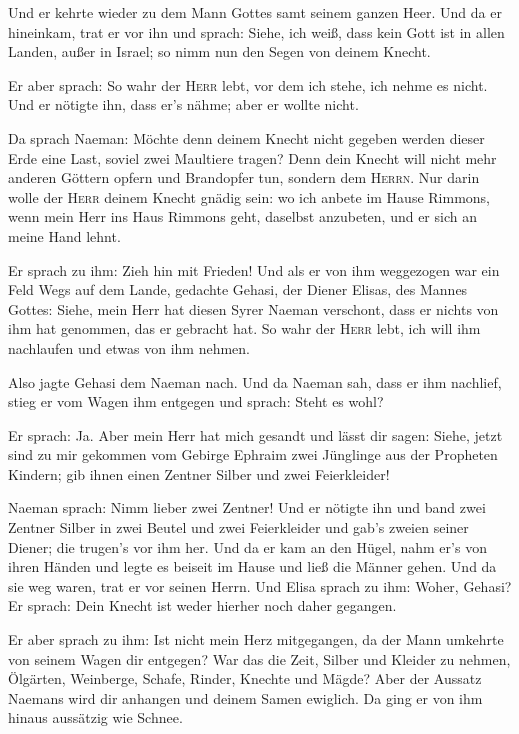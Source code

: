 Und er kehrte wieder zu dem Mann Gottes samt seinem
ganzen Heer. Und da er hineinkam, trat er vor ihn und sprach: Siehe, ich
weiß, dass kein Gott ist in allen Landen, außer in Israel; so nimm nun
den Segen von deinem Knecht.

 Er aber sprach: So wahr der \textsc{Herr} lebt, vor dem
ich stehe, ich nehme es nicht. Und er nötigte ihn, dass er's nähme; aber
er wollte nicht.

 Da sprach Naeman: Möchte denn deinem Knecht nicht
gegeben werden dieser Erde eine Last, soviel zwei Maultiere tragen? Denn
dein Knecht will nicht mehr anderen Göttern opfern und Brandopfer tun,
sondern dem \textsc{Herrn}.  Nur darin wolle der
\textsc{Herr} deinem Knecht gnädig sein: wo ich anbete im Hause Rimmons,
wenn mein Herr ins Haus Rimmons geht, daselbst anzubeten, und er sich an
meine Hand lehnt.

 Er sprach zu ihm: Zieh hin mit Frieden! Und als er von
ihm weggezogen war ein Feld Wegs auf dem Lande,  gedachte
Gehasi, der Diener Elisas, des Mannes Gottes: Siehe, mein Herr hat
diesen Syrer Naeman verschont, dass er nichts von ihm hat genommen, das
er gebracht hat. So wahr der \textsc{Herr} lebt, ich will ihm nachlaufen
und etwas von ihm nehmen.

 Also jagte Gehasi dem Naeman nach. Und da Naeman sah,
dass er ihm nachlief, stieg er vom Wagen ihm entgegen und sprach: Steht
es wohl?

 Er sprach: Ja. Aber mein Herr hat mich gesandt und lässt
dir sagen: Siehe, jetzt sind zu mir gekommen vom Gebirge Ephraim zwei
Jünglinge aus der Propheten Kindern; gib ihnen einen Zentner Silber und
zwei Feierkleider!

 Naeman sprach: Nimm lieber zwei Zentner! Und er nötigte
ihn und band zwei Zentner Silber in zwei Beutel und zwei Feierkleider
und gab's zweien seiner Diener; die trugen's vor ihm her.
 Und da er kam an den Hügel, nahm er's von ihren Händen
und legte es beiseit im Hause und ließ die Männer gehen. 
Und da sie weg waren, trat er vor seinen Herrn. Und Elisa sprach zu ihm:
Woher, Gehasi? Er sprach: Dein Knecht ist weder hierher noch daher
gegangen.

 Er aber sprach zu ihm: Ist nicht mein Herz mitgegangen,
da der Mann umkehrte von seinem Wagen dir entgegen? War das die Zeit,
Silber und Kleider zu nehmen, Ölgärten, Weinberge, Schafe, Rinder,
Knechte und Mägde?  Aber der Aussatz Naemans wird dir
anhangen und deinem Samen ewiglich. Da ging er von ihm hinaus aussätzig
wie Schnee.

